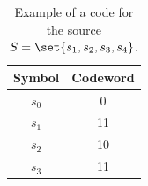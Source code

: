 \documentclass{subfiles}
\begin{document}
    \begin{table}[!ht]
        \centering
        \begin{tabular}{|c||c|}
            \hline
            \textbf{Symbol} & \textbf{Codeword} \\ 
            \hline
            \(s_{0}\) & 0 \\ 
            \(s_{1}\) & 11 \\ 
            \(s_{2}\) & 10 \\ 
            \(s_{3}\) & 11 \\ 
            \hline
        \end{tabular}
        \caption{Example of a code for the source \(S = \set{s_{1}, s_{2}, s_{3}, s_{4}}\).}
        \label{tab:singularCodeExaple}
    \end{table}
\end{document}
